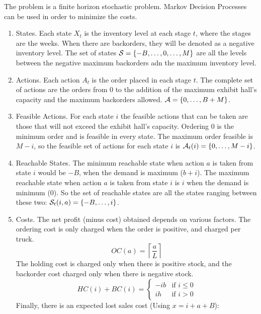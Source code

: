 \documentclass[11pt]{article}
\newcommand {\cA}{\ensuremath \mathcal{A}}
\newcommand {\cS}{\ensuremath \mathcal{S}}
\begin{document}
The problem is a finite horizon stochastic problem. Markov Decision Processes can be used in order to minimize the costs.

\begin{enumerate}
  \item States. Each state $X_t$ is the inventory level at each stage $t$, where the stages are the weeks. When there are backorders, they will be denoted as a negative inventory level. The set of states $\cS = \{-B, \ldots, 0, \ldots, M  \}$ are all the levels between the negative maximum backorders adn the maximum inventory level.
  \item Actions. Each action $A_t$ is the order placed in each stage $t$. The complete set of actions are the orders from 0 to the addition of the maximum exhibit hall's capacity and the maximum backorders allowed. $\cA = \{0,\ldots,B+M\}$.
  \item Feasible Actions. For each state $i$ the feasible actions that can be taken are those that will not exceed the exhibit hall's capacity. Ordering 0 is the minimum order and is feasible in every state. The maximum order feasible is $M-i$, so the feasible set of actions for each state $i$ is $\cA_t(i) =\{0,\ldots,M-i\}$.
  \item Reachable States. The minimum reachable state when action $a$ is taken from state $i$ would be $-B$, when the demand is maximum ($b+i$). The maximum reachable state when action $a$ is taken from state $i$ is $i$ when the demand is minimum (0). So the set of reachable states are all the states ranging between these two: $\cS_t(i,a) = \{-B, \ldots, i\}$.
  \item Costs. The net profit (minus cost) obtained depends on various factors. The ordering cost is only charged when the order is positive, and charged per truck.
  \begin{equation*}
    OC(a)=\left\lceil \frac{a}{L}\right\rceil  
  \end{equation*}
  The holding cost is charged only when there is positive stock, and the backorder cost charged only when there is negative stock.
  \begin{equation*}HC(i)+BC(i)=\left\{
    \begin{array}{cc}
      -ib & \textrm{if $i \le 0$}\\
      ih & \textrm{if $i > 0$}
    \end{array} \right.
  \end{equation*}
  Finally, there is an expected lost sales cost (Using $x=i+a+B$):
    \begin{align*}

\end{align*}
\end{enumerate}
\end{document}
